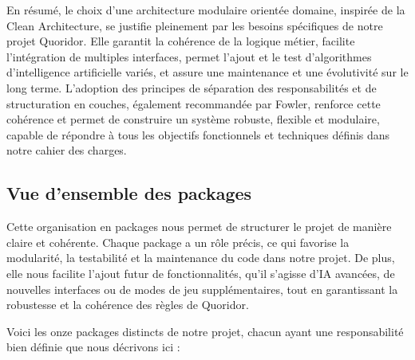 \documentclass[a4paper]{article}
\begin{document}
En résumé, le choix d’une architecture modulaire orientée domaine, inspirée de la Clean Architecture\cite{martin2017clean},
se justifie pleinement par les besoins spécifiques de notre projet Quoridor. Elle garantit la cohérence de la logique métier,
facilite l’intégration de multiples interfaces, permet l’ajout et le test d’algorithmes d’intelligence artificielle variés,
et assure une maintenance et une évolutivité sur le long terme. L’adoption des principes de séparation des responsabilités
et de structuration en couches, également recommandée par Fowler\cite{fowler2002patterns}, renforce cette cohérence et permet
de construire un système robuste, flexible et modulaire, capable de répondre à tous les objectifs fonctionnels et techniques
définis dans notre cahier des charges.

\subsection{Vue d'ensemble des packages}

Cette organisation en packages nous permet de structurer le projet de manière claire et cohérente. Chaque package a un rôle précis, ce qui favorise la modularité, la testabilité et la maintenance du code dans notre projet. De plus, elle nous facilite l’ajout futur de fonctionnalités, qu’il s’agisse d’IA avancées, de nouvelles interfaces ou de modes de jeu supplémentaires, tout en garantissant la robustesse et la cohérence des règles de Quoridor.

Voici les onze packages distincts de notre projet, chacun ayant une responsabilité bien définie que nous décrivons ici :
\end{document}
